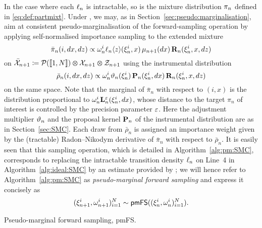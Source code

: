 In the case where each $\ell_{n}$ is intractable, so is the mixture distribution $\pi_n$ defined in \eqref{eq:def:partmixt}. Under , we may, as in Section~\ref{sec:pseudo:marginalisation}, aim at consistent pseudo-marginalisation of the forward-sampling operation by applying self-normalised importance sampling to the extended mixture  
$$
\bar{\pi}_n(i, d x, d z)
\propto \omega_{n}^{i} \ell_{n} \langle z \rangle(\xi_{n}^{i}, x) \, \mu_{n + 1}(d x) \, \mathbf{R}_{n}(\xi_{n}^{i}, x, d z) 
$$
on $\bar{\mathcal{X}}_{n + 1} \coloneqq \mathcal{P}(\llbracket 1, N \rrbracket) \varotimes \mathcal{X}_{n + 1} \varotimes \mathcal{Z}_{n + 1}$ using the instrumental distribution  
$$
\bar{\rho}_n(i, d x, d z) \propto \omega_{n}^{i} \vartheta_{n}(\xi_{n}^{i}) \, \mathbf{P}_{n}(\xi_{n}^{i}, d x) \, \mathbf{R}_{n}(\xi_{n}^{i}, x, d z)
$$
on the same space. Note that the marginal of $\bar{\pi}_n$ with respect to $(i, x)$ is the distribution proportional to $\omega_{n}^{i} \mathbf{L}_{n}^\varepsilon(\xi_{n}^{i}, d x)$, whose distance to the target $\pi_n$ of interest is controlled by the precision parameter $\varepsilon$. Here the adjustment multiplier $\vartheta_{n}$ and the proposal kernel $\mathbf{P}_{n}$ of the instrumental distribution are as in Section~\ref{sec:SMC}. Each draw from $\bar{\rho}_n$ is assigned an importance weight given by the (tractable) Radon--Nikodym derivative of $\bar{\pi}_n$ with respect to $\bar{\rho}_n$. It is easily seen that this sampling operation, which is detailed in Algorithm~\ref{alg:pm:SMC}, corresponds to replacing the intractable transition density $\ell_{n}$ on Line~4 in Algorithm~\ref{alg:ideal:SMC} by an estimate provided by ; we will hence refer to Algorithm~\ref{alg:pm:SMC} as \emph{pseudo-marginal forward sampling} and express it concisely as 
$$
    (\xi_{n + 1}^{i}, \omega_{n + 1}^{i})_{i = 1}^N \sim \mathsf{pmFS}((\xi_{n}^{i}, \omega_{n}^{i})_{i = 1}^N). 
$$

\begin{algorithm}[h] 
\caption{Pseudo-marginal forward sampling, \textsf{pmFS}.} \label{alg:pm:SMC}
\end{algorithm}

